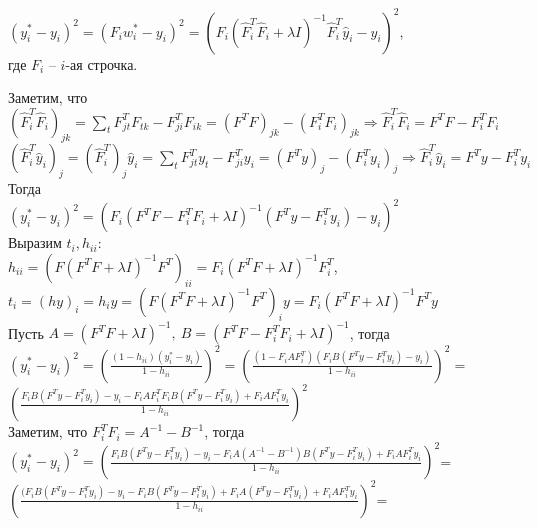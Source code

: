 \documentclass[10pt]{article}
\begin{document}
$ (y^*_i - y_i)^2 = (F_iw^*_i - y_i)^2 = (F_i(\hat{F}_i^T\hat{F}_i + \lambda I)^{-1}\hat{F}_i^T\hat{y}_i - y_i)^2$,\\

где $F_i$ -- $i$-ая строчка.

Заметим, что \\

$(\hat{F}_i^T\hat{F}_i)_{jk} = \sum_{t} F^T_{jt}F_{tk} - F^T_{ji}F_{ik} = (F^TF)_{jk} - (F_i^TF_i)_{jk} \Rightarrow \hat{F}_i^T\hat{F}_i = F^TF - F_i^TF_i$\\

$(\hat{F}_i^T\hat{y}_i)_j = (\hat{F}_i^T)_j\hat{y}_i = \sum_{t} F^T_{jt}y_t - F^T_{ji}y_i = (F^Ty)_j - (F_i^Ty_i)_j \Rightarrow \hat{F}_i^T\hat{y}_i =  F^Ty - F_i^Ty_i$\\

Тогда \\

$(y^*_i - y_i)^2 =\left(F_i(F^TF - F_i^TF_i + \lambda I)^{-1}(F^Ty - F_i^Ty_i) - y_i\right)^2 $\\

Выразим $t_i, h_{ii}$:\\

$h_{ii} = (F(F^TF +\lambda I)^{-1} F^T)_{ii} = F_i(F^TF +\lambda I)^{-1} F_i^T$,\\

$t_i = (hy)_i=h_i y =(F(F^TF +\lambda I)^{-1} F^T)_i y = F_i(F^TF +\lambda I)^{-1} F^Ty$\\

Пусть $A = (F^TF +\lambda I)^{-1}, \medspace B = (F^TF - F_i^TF_i + \lambda I)^{-1}$, тогда \\

$(y^*_i - y_i)^2 = \left( \frac{(1-h_{ii})(y^*_i - y_i) }{1-h_{ii}} \right)^2 = 
\left( \frac{(1- F_i AF_i^T)(F_iB(F^Ty-F_i^Ty_i) - y_i) }{1-h_{ii}} \right)^2=$\\

$\left( \frac{F_iB(F^Ty-F_i^Ty_i) - y_i- F_i AF_i^TF_iB(F^Ty-F_i^Ty_i) +F_i AF_i^T y_i }{1-h_{ii}} \right)^2$\\

Заметим, что $F_i^TF_i = A^{-1} - B^{-1} $, тогда\\

$(y^*_i - y_i)^2 = \left( \frac{F_iB(F^Ty-F_i^Ty_i) - y_i- F_i A(A^{-1} - B^{-1})B(F^Ty-F_i^Ty_i) +F_i AF_i^T y_i }{1-h_{ii}} \right)^2$=\\

$\left( \frac{(F_iB(F^Ty-F_i^Ty_i) - y_i- F_i B(F^Ty-F_i^Ty_i) + F_i A(F^Ty-F_i^Ty_i) +F_i AF_i^T y_i }{1-h_{ii}} \right)^2$=\\
\end{document}
